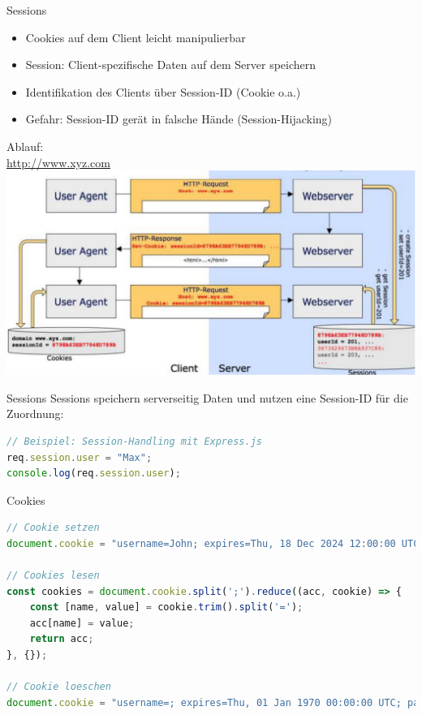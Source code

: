 \begin{definition}{Sessions}
\begin{itemize}
\item Cookies auf dem Client leicht manipulierbar
\item Session: Client-spezifische Daten auf dem Server speichern
\item Identifikation des Clients über Session-ID (Cookie o.a.)
\item Gefahr: Session-ID gerät in falsche Hände (Session-Hijacking)
\end{itemize}
\end{definition}
Ablauf:\\
\href{http://www.xyz.com}{http://www.xyz.com}\\
\includegraphics[width=\linewidth]{images/2024_12_29_858f09cde51177c71657g-31(1)}

\begin{definition}{Sessions}
Sessions speichern serverseitig Daten und nutzen eine Session-ID für die Zuordnung:
\begin{lstlisting}[language=JavaScript, style=basesmol]
// Beispiel: Session-Handling mit Express.js
req.session.user = "Max";
console.log(req.session.user);
\end{lstlisting}
\end{definition}

\begin{KR}{Cookies}
\begin{lstlisting}[language=JavaScript, style=basesmol]
// Cookie setzen
document.cookie = "username=John; expires=Thu, 18 Dec 2024 12:00:00 UTC; path=/";

// Cookies lesen
const cookies = document.cookie.split(';').reduce((acc, cookie) => {
    const [name, value] = cookie.trim().split('=');
    acc[name] = value;
    return acc;
}, {});

// Cookie loeschen
document.cookie = "username=; expires=Thu, 01 Jan 1970 00:00:00 UTC; path=/;";
\end{lstlisting}
\end{KR}


